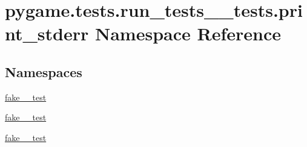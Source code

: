 \hypertarget{namespacepygame_1_1tests_1_1run__tests____tests_1_1print__stderr}{}\section{pygame.\+tests.\+run\+\_\+tests\+\_\+\+\_\+tests.\+print\+\_\+stderr Namespace Reference}
\label{namespacepygame_1_1tests_1_1run__tests____tests_1_1print__stderr}
\subsection*{Namespaces}
\begin{DoxyCompactItemize}
\item 
 \hyperlink{namespacepygame_1_1tests_1_1run__tests____tests_1_1print__stderr_1_1fake__2__test}{fake\+\_\+\_\+test}
\item 
 \hyperlink{namespacepygame_1_1tests_1_1run__tests____tests_1_1print__stderr_1_1fake__3__test}{fake\+\_\+\_\+test}
\item 
 \hyperlink{namespacepygame_1_1tests_1_1run__tests____tests_1_1print__stderr_1_1fake__4__test}{fake\+\_\+\_\+test}
\end{DoxyCompactItemize}
